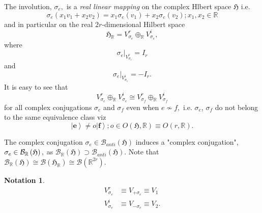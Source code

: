 \documentclass[aps,preprint]{revtex4}
\newtheorem{notation}[theorem]{Notation}
\begin{document}
The involution, $\sigma _{e},$ is a \emph{real linear mapping} on the
complex Hlbert space $\mathfrak{H}$ i.e.%
\begin{equation}
\sigma _{e}\left( x_{1}v_{1}+x_{2}v_{2}\right) =x_{1}\sigma _{e}\left(
v_{1}\right) +x_{2}\sigma _{e}\left( v_{2}\right) ;x_{1},x_{2}\in \mathbb{R}
\end{equation}%
and in particular on the real $2r$-dimensional Hilbert space 
\begin{equation}
\mathfrak{H}_{\mathbb{R}}=V_{\sigma _{e}}^{r}\oplus _{\mathbb{R}}V_{\sigma
_{e}}^{i},
\end{equation}%
where 
\begin{equation}
\left. \sigma _{e}\right\vert _{V_{\sigma _{e}}^{r}}=I_{r}
\end{equation}%
and 
\begin{equation}
\left. \sigma _{e}\right\vert _{V_{\sigma _{e}}^{i}}=-I_{r}.
\end{equation}%
It is easy to see that 
\begin{equation}
V_{\sigma _{e}}^{r}\oplus _{\mathbb{R}}V_{\sigma _{e}}^{i}\cong V_{\sigma
_{f}}^{r}\oplus _{\mathbb{R}}V_{\sigma _{f}}^{i}
\end{equation}%
for all complex conjugations $\sigma _{e}$ and $\sigma _{f}$ even when $%
e\nsim f,$ i.e. $\sigma _{e}$, $\sigma _{f}$ do not belong to the same
equivalence class viz 
\begin{equation}
\left\vert \mathbf{e}\right\rangle \neq o\left\vert \mathbf{f}\right\rangle
;o\in O\left( \mathfrak{H,}\mathbb{R}\right) \equiv O\left( r\mathfrak{,}%
\mathbb{R}\right) .
\end{equation}

The complex conjugation $\sigma_{e}\in\mathcal{B}_{anti}\left( \mathfrak{H}%
\right) $ induces a "complex conjugation", $\sigma_{e}\in\mathcal{B}_{%
\mathbb{R}}\left( \mathfrak{H}\right) ,$ as $\mathcal{B}_{\mathbb{R}}\left( 
\mathfrak{H}\right) \supset\mathcal{B}_{anti}\left( \mathfrak{H}\right) .$
Note that $\mathcal{B}_{\mathbb{R}}\left( \mathfrak{H}\right) \cong\mathcal{B%
}\left( \mathfrak{H}_{\mathbb{R}}\right) \cong\mathcal{B}\left( \mathbb{R}%
^{2r}\right) .$

\begin{notation}
\begin{align}
V_{\sigma _{e}}^{r}& \equiv V_{+\sigma _{e}}\equiv V_{1} \\
V_{\sigma _{e}}^{i}& \equiv V_{-\sigma _{e}}\equiv V_{2}.
\end{align}
\end{notation}
\end{document}
